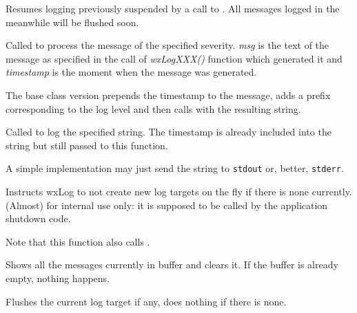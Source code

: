 Resumes logging previously suspended by a call to
. All messages logged in the meanwhile will be
flushed soon.

\label{wxlogdolog}


Called to process the message of the specified severity. {\it msg} is the text
of the message as specified in the call of {\it wxLogXXX()} function which
generated it and {\it timestamp} is the moment when the message was generated.

The base class version prepends the timestamp to the message, adds a prefix
corresponding to the log level and then calls
 with the resulting string.

\label{wxlogdologstring}


Called to log the specified string. The timestamp is already included into the
string but still passed to this function.

A simple implementation may just send the string to {\tt stdout} or, better,
{\tt stderr}.

\label{wxlogdontcreateondemand}


Instructs wxLog to not create new log targets on the fly if there is none
currently. (Almost) for internal use only: it is supposed to be called by the
application shutdown code.

Note that this function also calls
.

\label{wxlogflush}


Shows all the messages currently in buffer and clears it. If the buffer
is already empty, nothing happens.

\label{wxlogflushactive}


Flushes the current log target if any, does nothing if there is none.

